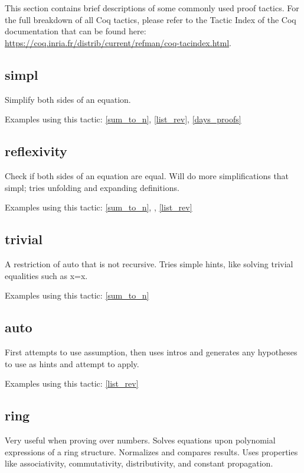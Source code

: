 
This section contains brief descriptions of some commonly used proof tactics.
For the full breakdown of all Coq tactics, please refer to the Tactic Index of the Coq documentation that can be found here:
\url{https://coq.inria.fr/distrib/current/refman/coq-tacindex.html}.


\subsection{simpl} \label{simpl}
Simplify both sides of an equation.

\noindent
Examples using this tactic: 
\ref{sum_to_n}, \ref{list_rev}, \ref{days_proofs}




\subsection{reflexivity} \label{reflexivity}
Check if both sides of an equation are equal. 
Will do more simplifications that simpl; tries unfolding and expanding definitions.

\noindent
Examples using this tactic: 
\ref{sum_to_n}, , \ref{list_rev}




\subsection{trivial} \label{trivial}
A restriction of auto that is not recursive. 
Tries simple hints, like solving trivial equalities such as x=x.

\noindent
Examples using this tactic: 
\ref{sum_to_n}




\subsection{auto} \label{auto}
First attempts to use assumption, then uses intros and generates any hypotheses to use as hints and attempt to apply.

\noindent
Examples using this tactic: 
\ref{list_rev}




\subsection{ring} \label{ring}
Very useful when proving over numbers.
Solves equations upon polynomial expressions of a ring structure. 
Normalizes and compares results.
Uses properties like associativity, commutativity, distributivity, and constant propagation.

